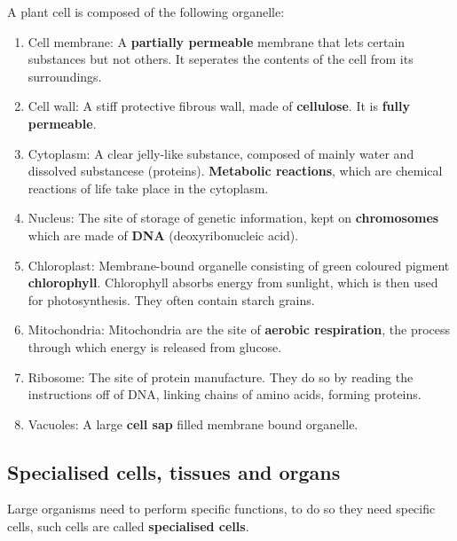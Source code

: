 \documentclass[twocolumn]{article}
\begin{document}
A plant cell is composed of the following organelle:
\begin{enumerate}
	\item Cell membrane: A \textbf{partially permeable} membrane that lets certain substances 
		but not others. It seperates the contents of the cell from its surroundings. 
	\item Cell wall: A stiff protective fibrous wall, made of \textbf{cellulose}. It is
		\textbf{fully permeable}.
	\item Cytoplasm: A clear jelly-like substance, composed of mainly water and dissolved
		substancese (proteins). \textbf{Metabolic reactions}, which are chemical reactions
		of life take place in the cytoplasm.
	\item Nucleus: The site of storage of genetic information, kept on 
		\textbf{chromosomes} which are made of \textbf{DNA} (deoxyribonucleic acid).
	\item Chloroplast: Membrane-bound organelle consisting of green coloured pigment 
		\textbf{chlorophyll}. Chlorophyll absorbs energy from sunlight, which is then
		used for photosynthesis. They often contain starch grains.
	\item Mitochondria: Mitochondria are the site of \textbf{aerobic respiration}, the 
		process through which energy is released from glucose.
	\item Ribosome: The site of protein manufacture. They do so by reading the 
		instructions off of DNA, linking chains of amino acids, forming proteins.
	\item Vacuoles: A large \textbf{cell sap} filled membrane bound organelle.
\end{enumerate}

\subsection{Specialised cells, tissues and organs}
Large organisms need to perform specific functions, to do so they need specific cells,
such cells are called \textbf{specialised cells}.
\end{document}

